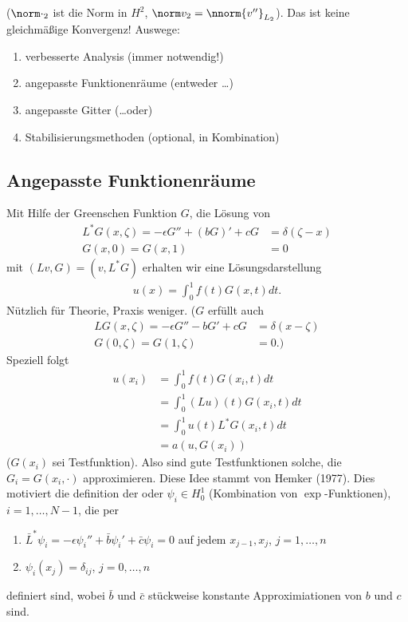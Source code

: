 ($\norm \cdot_{2}$ ist die Norm in $H^2$, $\norm v_{2} = \nnorm {v''}_{L_{2}}$). 
Das ist keine gleichmäßige Konvergenz! Auswege:
\begin{enumerate}
\item verbesserte Analysis (immer notwendig!)
\item angepasste Funktionenräume (entweder \dots)
\item angepasste Gitter (\dots oder)
\item Stabilisierungsmethoden (optional, in Kombination)
\end{enumerate}

\subsection{Angepasste Funktionenräume}
\label{sec:angep-funkt}

Mit Hilfe der Greenschen Funktion $G$, die Lösung von
\begin{align*}
  L^{*}G(x, \zeta) = - \epsilon G'' + (bG)' + cG &= \delta(\zeta-x)\\
  G(x, 0) = G(x, 1) &= 0
\end{align*}
mit $(Lv, G) = (v, L^{*}G)$ erhalten wir eine Lösungsdarstellung
\begin{align*}
  u(x) = \int_{0}^{1}f(t) G(x, t)dt. 
\end{align*}
Nützlich für Theorie, Praxis weniger. 
($G$ erfüllt auch
\begin{align*}
  LG(x, \zeta) = - \epsilon G'' - bG' + cG &= \delta(x - \zeta)\\
  G(0, \zeta) = G(1, \zeta) &= 0. )
\end{align*}
Speziell folgt
\begin{align*}
  u(x_{i}) &= \int_{0}^{1}f(t) G(x_{i}, t)dt\\
  &= \int_{0}^{1}(Lu)(t) G(x_{i}, t) dt\\
  &= \int_{0}^{1}u(t) L^{*}G(x_{i}, t) dt\\
  &= a (u, G(x_{i}))
\end{align*}
($G(x_{i})$ sei Testfunktion). 
Also sind gute Testfunktionen solche, die $G_{i} = G(x_{i}, \cdot)$ approximieren. Diese Idee stammt von Hemker (1977).  Dies motiviert die definition der  oder  $\psi_{i} \in H_{0}^{1}$ (Kombination von $\exp$-Funktionen), $i= 1, \dots, N-1$, die per
\begin{enumerate}
\item $\bar L^{*} \psi_{i} = - \epsilon \psi_{i}'' + \bar b \psi_{i}' + \bar c \psi_{i} = 0$
  auf jedem $x_{j-1}, x_{j}$, $j = 1, \dots, n$
\item $\psi_{i}(x_{j}) = \delta_{ij}$, $j = 0, \dots, n$
\end{enumerate}
definiert sind, wobei $\bar b$ und $\bar c$ stückweise konstante Approximiationen von $b$ und $c$ sind. 

